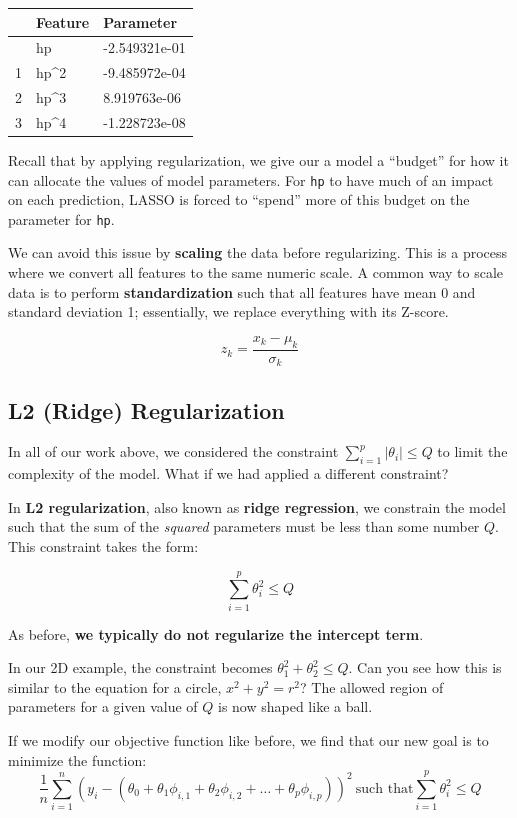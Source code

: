 \documentclass[
  letterpaper,
  DIV=11,
  numbers=noendperiod]{scrreprt}
\begin{document}
\begin{longtable}[]{@{}lll@{}}
\toprule\noalign{}
& Feature & Parameter \\
\midrule\noalign{}
\endhead
\bottomrule\noalign{}
\endlastfoot
0 & hp & -2.549321e-01 \\
1 & hp\^{}2 & -9.485972e-04 \\
2 & hp\^{}3 & 8.919763e-06 \\
3 & hp\^{}4 & -1.228723e-08 \\
\end{longtable}

Recall that by applying regularization, we give our a model a ``budget''
for how it can allocate the values of model parameters. For \texttt{hp}
to have much of an impact on each prediction, LASSO is forced to
``spend'' more of this budget on the parameter for \texttt{hp}.

We can avoid this issue by \textbf{scaling} the data before
regularizing. This is a process where we convert all features to the
same numeric scale. A common way to scale data is to perform
\textbf{standardization} such that all features have mean 0 and standard
deviation 1; essentially, we replace everything with its Z-score.

\[z_k = \frac{x_k - \mu_k}{\sigma_k}\]

\subsection{L2 (Ridge) Regularization}\label{l2-ridge-regularization}

In all of our work above, we considered the constraint
\(\sum_{i=1}^p |\theta_i| \leq Q\) to limit the complexity of the model.
What if we had applied a different constraint?

In \textbf{L2 regularization}, also known as \textbf{ridge regression},
we constrain the model such that the sum of the \emph{squared}
parameters must be less than some number \(Q\). This constraint takes
the form:

\[\sum_{i=1}^p \theta_i^2 \leq Q\]

As before, \textbf{we typically do not regularize the intercept term}.

In our 2D example, the constraint becomes
\(\theta_1^2 + \theta_2^2 \leq Q\). Can you see how this is similar to
the equation for a circle, \(x^2 + y^2 = r^2\)? The allowed region of
parameters for a given value of \(Q\) is now shaped like a ball.

If we modify our objective function like before, we find that our new
goal is to minimize the function:
\[\frac{1}{n} \sum_{i=1}^n (y_i - (\theta_0 + \theta_1 \phi_{i, 1} + \theta_2 \phi_{i, 2} + \ldots + \theta_p \phi_{i, p}))^2\:\text{such that} \sum_{i=1}^p \theta_i^2 \leq Q\]
\end{document}
